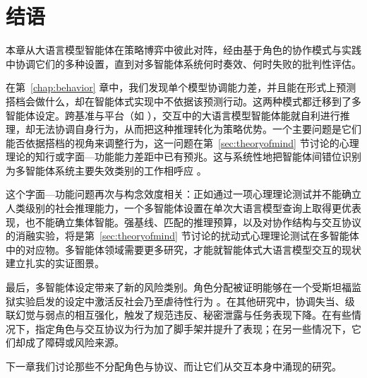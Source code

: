 \section{结语}
本章从大语言模型智能体在策略博弈中彼此对阵，经由基于角色的协作模式与实践中协调它们的多种设置，直到对多智能体系统何时奏效、何时失败的批判性评估。

在第~\ref{chap:behavior} 章中，我们发现单个模型协调能力差，并且能在形式上预测搭档会做什么，却在智能体式实现中不依据该预测行动。这两种模式都迁移到了多智能体设定。跨基准与平台（如 \citep{xu2024magic, agashe2025llm}），交互中的大语言模型智能体能就自利进行推理，却无法协调自身行为，从而把这种推理转化为策略优势。一个主要问题是它们能否依据搭档的视角来调整行为，这一问题在第~\ref{sec:theoryofmind} 节讨论的心理理论的知行或字面—功能能力差距中已有预兆。这与系统性地把智能体间错位识别为多智能体系统主要失效类别的工作相呼应 \citep{cemri2025masfail}。

这个字面—功能问题再次与构念效度相关：正如通过一项心理理论测试并不能确立人类级别的社会推理能力，一个多智能体设置在单次大语言模型查询上取得更优表现，也不能确立集体智能。强基线、匹配的推理预算，以及对协作结构与交互协议的消融实验，将是第~\ref{sec:theoryofmind} 节讨论的扰动式心理理论测试在多智能体中的对应物。多智能体领域需要更多研究，才能就智能体式大语言模型交互的现状建立扎实的实证图景。

最后，多智能体设定带来了新的风险类别。角色分配被证明能够在一个受斯坦福监狱实验启发的设定中激活反社会乃至虐待性行为 \citep{campedelli2024want}。在其他研究中，协调失当、级联幻觉与弱点的相互强化，触发了规范违反、秘密泄露与任务表现下降。在有些情况下，指定角色与交互协议为行为加了脚手架并提升了表现；在另一些情况下，它们却成了障碍或风险来源。

下一章我们讨论那些不分配角色与协议、而让它们从交互本身中涌现的研究。




